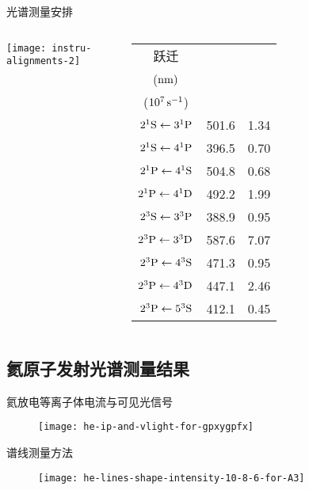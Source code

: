 \begin{CJK*}{UTF8}{kai}
\begin{frame}{光谱测量安排}
	\begin{columns}
	\begin{center}
		\texttt{[image: instru-alignments-2]}
	\end{center}
\begin{tabular}{ccc}\toprule
跃迁 & \makecell[c]{$\lambda_{q\to p}$\\ (${\rm nm})$} & \makecell[c]{$A_{q\to p}^{\rm eff}$\\ ($10^7\,{\rm s}^{-1}$)}\\
\hline
$2^1{\rm S}\leftarrow3^1{\rm P}$ & 501.6 & 1.34 \\
$2^1{\rm S}\leftarrow4^1{\rm P}$ & 396.5 & 0.70 \\
$2^1{\rm P}\leftarrow4^1{\rm S}$ & 504.8 & 0.68 \\
$2^1{\rm P}\leftarrow4^1{\rm D}$ & 492.2 & 1.99 \\
$2^3{\rm S}\leftarrow3^3{\rm P}$ & 388.9 & 0.95 \\
$2^3{\rm P}\leftarrow3^3{\rm D}$ & 587.6 & 7.07 \\
$2^3{\rm P}\leftarrow4^3{\rm S}$ & 471.3 & 0.95 \\
$2^3{\rm P}\leftarrow4^3{\rm D}$ & 447.1 & 2.46 \\
$2^3{\rm P}\leftarrow5^3{\rm S}$ & 412.1 & 0.45 \\
\bottomrule
\end{tabular}
	\end{columns}
\end{frame}

\subsection{氦原子发射光谱测量结果}

\begin{frame}{氦放电等离子体电流与可见光信号}
	\centering
  \begin{figure}
      \texttt{[image: he-ip-and-vlight-for-gpxygpfx]}
  \end{figure}
\end{frame}

\begin{frame}{谱线测量方法}
	\centering
  \begin{figure}
      \texttt{[image: he-lines-shape-intensity-10-8-6-for-A3]}
  \end{figure}
\end{frame}


\end{CJK*}
